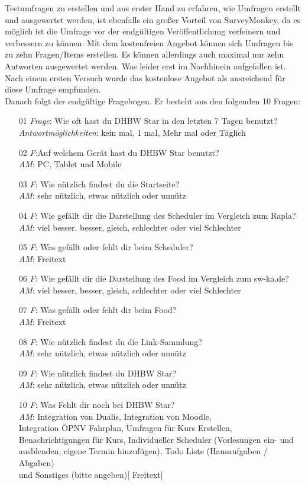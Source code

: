 Testumfragen zu erstellen und aus erster Hand zu erfahren, wie Umfragen erstellt und ausgewertet werden, ist ebenfalls ein großer Vorteil von SurveyMonkey, da es möglich ist die Umfrage vor der endgültigen Veröffentlichung verfeinern und verbessern zu können. 
Mit dem kostenfreien Angebot können sich Umfragen bis zu zehn Fragen/Items erstellen. Es können allerdings auch maximal nur zehn Antworten ausgewertet werden. Was leider erst im Nachhinein aufgefallen ist.\\
Nach einem ersten Versuch wurde das kostenlose Angebot als ausreichend für diese Umfrage empfunden.
\\
Danach folgt der endgültige Fragebogen. Er besteht aus den folgenden 10 Fragen:
\begin{itemize}
	\item[01] {\emph{Frage}: Wie oft hast du DHBW Star in den letzten 7 Tagen benutzt?\\
		\emph{Antwortmöglichkeiten}: kein mal, 1 mal, Mehr mal oder Täglich}
	\item[02]{\emph{F}:Auf welchem Gerät hast du DHBW Star benutzt?\\
		\emph{AM}: PC, Tablet und Mobile}
	\item[03]{\emph{F}: Wie nützlich findest du die Startseite?\\
		\emph{AM}: sehr nützlich, etwas nützlich oder unnütz}
	\item[04]{\emph{F}: Wie gefällt dir die Darstellung des Scheduler im Vergleich zum Rapla?\\
		\emph{AM}: viel besser, besser, gleich, schlechter oder viel Schlechter}
	\item[05]{\emph{F}: Was gefällt oder fehlt dir beim Scheduler?\\
		\emph{AM}: Freitext}
	\item[06]{\emph{F}: Wie gefällt dir die Darstellung des Food im Vergleich zum sw-ka.de?\\
		\emph{AM}: viel besser, besser, gleich, schlechter oder viel Schlechter}
	\item[07]{\emph{F}: Was gefällt oder fehlt dir beim Food?\\
		\emph{AM}: Freitext}
	\item[08]{\emph{F}: Wie nützlich findest du die Link-Sammlung?\\
		\emph{AM}: sehr nützlich, etwas nützlich oder unnütz}
	\item[09]{\emph{F}: Wie nützlich findest du DHBW Star?\\
		\emph{AM}: sehr nützlich, etwas nützlich oder unnütz}
	\item[10]{\emph{F}: Was Fehlt dir noch bei DHBW Star?\\
		\emph{AM}: Integration von Dualis, Integration von Moodle,\\ Integration ÖPNV Fahrplan, Umfragen für Kurs Erstellen,\\ Benachrichtigungen für Kurs, Individueller Scheduler (Vorlesungen ein- und ausblenden, eigene Termin hinzufügen), Todo Liste (Hausaufgaben / Abgaben)\\ und Sonstiges (bitte angeben)[ Freitext]}
\end{itemize}
